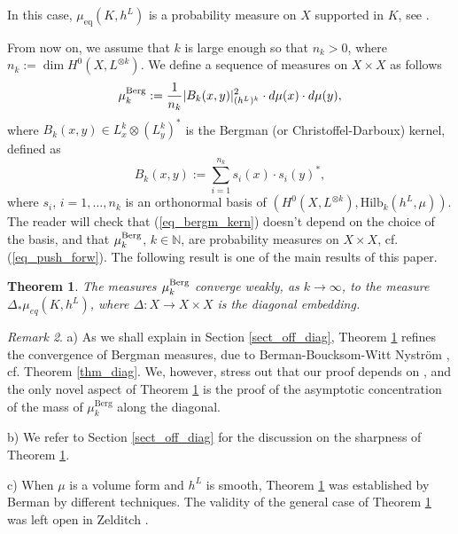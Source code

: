 \documentclass[12pt]{article}
\numberwithin{equation}{section}
\theoremstyle{theorem}
\newtheorem{thm}{Theorem}[section]
\theoremstyle{definition}
\theoremstyle{remark}
\newtheorem{rem}[thm]{Remark}
\newcommand{\nat}{\mathbb{N}}
\begin{document}
	In this case, $\mu_{\mathrm{eq}}(K, h^L)$ is a probability measure on $X$ supported in $K$, see \cite[Proposition 1.10]{BermanBouckBalls}.
	\par 
	From now on, we assume that $k$ is large enough so that $n_k > 0$, where $n_k := \dim H^0(X, L^{\otimes k})$.
	We define a sequence of measures on $X \times X$ as follows
	\begin{equation}\label{eq_mu_begmm}
		\mu_k^{\rm{Berg}} := \frac{1}{n_k} |B_k(x, y)|^{2}_{(h^L)^k} \cdot d \mu(x) \cdot d \mu(y),
	\end{equation}
	where $B_k(x, y) \in L^k_x \otimes (L^k_y)^*$ is the Bergman (or Christoffel-Darboux) kernel, defined as
	\begin{equation}\label{eq_bergm_kern}
		B_k(x, y) := \sum_{i = 1}^{n_k} s_i(x) \cdot s_i(y)^*,
	\end{equation}
	where $s_i$, $i = 1, \ldots, n_k$ is an orthonormal basis of $(H^0(X, L^{\otimes k}), {\textrm{Hilb}}_k(h^L, \mu))$. 
	The reader will check that (\ref{eq_bergm_kern}) doesn't depend on the choice of the basis, and that $\mu_k^{\rm{Berg}}$, $k \in \nat$, are probability measures on $X \times X$, cf. (\ref{eq_push_forw}).
	The following result is one of the main results of this paper.
	\par 
	\begin{thm}\label{thm_off_diag}
		The measures $\mu_k^{\rm{Berg}}$ converge weakly, as $k \to \infty$, to the measure $\Delta_* \mu_{eq}(K, h^L)$, where $\Delta: X \to X \times X$ is the diagonal embedding.
	\end{thm}
	\begin{rem}
		a) As we shall explain in Section \ref{sect_off_diag}, Theorem \ref{thm_off_diag} refines the convergence of Bergman measures, due to Berman-Boucksom-Witt Nyström \cite{BerBoucNys}, cf. Theorem \ref{thm_diag}.
		We, however, stress out that our proof depends on \cite{BerBoucNys}, and the only novel aspect of Theorem \ref{thm_off_diag} is the proof of the asymptotic concentration of the mass of $\mu_k^{\mathrm{Berg}}$ along the diagonal.
		\par 
		b) We refer to Section \ref{sect_off_diag} for the discussion on the sharpness of Theorem \ref{thm_off_diag}.
		\par 
		c) When $\mu$ is a volume form and $h^L$ is smooth, Theorem \ref{thm_off_diag} was established by Berman \cite[Theorem 1.6]{BermanEnvProj} by different techniques. 
		The validity of the general case of Theorem \ref{thm_off_diag} was left open in Zelditch \cite[after Theorem 2.5]{ZelditchErgodSurvey}.
	\end{rem}
\end{document}
